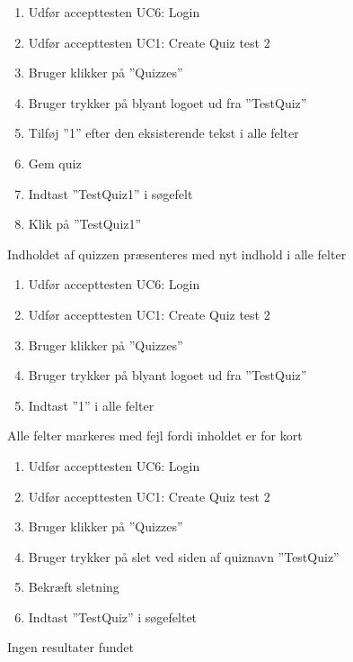 
		{
		\begin{enumerate}
			\item Udfør accepttesten UC6: Login
			\item Udfør accepttesten UC1: Create Quiz test 2
			\item Bruger klikker på ''Quizzes''
			\item Bruger trykker på blyant logoet ud fra ''TestQuiz''
			\item Tilføj ''1'' efter den eksisterende tekst i alle felter
			\item Gem quiz
			\item Indtast ''TestQuiz1'' i søgefelt
			\item Klik på ''TestQuiz1''
		\end{enumerate}
		} %
		{Indholdet af quizzen præsenteres med nyt indhold i alle felter} %
		{} %
		{} %

		{
		\begin{enumerate}
			\item Udfør accepttesten UC6: Login
			\item Udfør accepttesten UC1: Create Quiz test 2
			\item Bruger klikker på ''Quizzes''
			\item Bruger trykker på blyant logoet ud fra ''TestQuiz''
			\item Indtast ''1'' i alle felter
		\end{enumerate}
		} %
		{Alle felter markeres med fejl fordi inholdet er for kort} %
		{} %
		{} %

		{
		\begin{enumerate}
			\item Udfør accepttesten UC6: Login
			\item Udfør accepttesten UC1: Create Quiz test 2
			\item Bruger klikker på ''Quizzes''
			\item Bruger trykker på slet ved siden af quiznavn ''TestQuiz''
			\item Bekræft sletning
			\item Indtast ''TestQuiz'' i søgefeltet
		\end{enumerate}
		} %
		{Ingen resultater fundet} %
		{} %
		{} %

